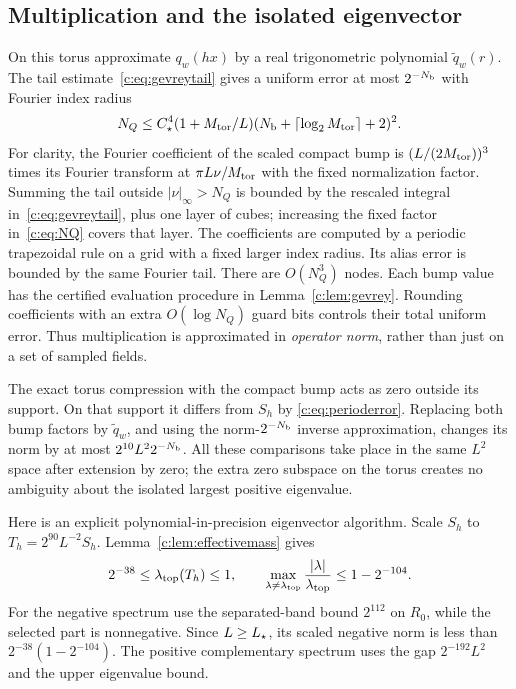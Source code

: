 \subsection{Multiplication and the isolated eigenvector}
On this torus approximate $q_w(hx)$ by a real trigonometric polynomial
$\widetilde q_w(r)$. The tail estimate~\eqref{c:eq:gevreytail} gives a uniform
error at most $2^{-N_{\rm b}}$ with Fourier index radius
\begin{equation}
 N_Q\le C_\star^4(1+M_{\rm tor}/L)(N_{\rm b}+\lceil\log_2M_{\rm tor}\rceil+2)^2.
                                                               \label{c:eq:NQ}
\end{equation}
For clarity, the Fourier coefficient of the scaled compact bump is
$(L/(2M_{\rm tor}))^3$ times its Fourier transform at $\pi L\nu/M_{\rm tor}$ with the
fixed normalization factor. Summing the tail outside $|\nu|_\infty>N_Q$
is bounded by the rescaled integral in~\eqref{c:eq:gevreytail}, plus
one layer of cubes; increasing the fixed factor in~\eqref{c:eq:NQ}
covers that layer. The coefficients are computed by a periodic
trapezoidal rule on a grid with a fixed larger index radius. Its
alias error is bounded by the same Fourier tail. There are
$O(N_Q^3)$ nodes. Each bump value has the certified evaluation
procedure in Lemma~\ref{c:lem:gevrey}. Rounding coefficients with an
extra $O(\log N_Q)$ guard bits controls their total uniform error.
Thus multiplication is approximated in \emph{operator norm}, rather
than just on a set of sampled fields.

The exact torus compression with the compact bump acts as zero
outside its support. On that support it differs from $S_h$ by
\eqref{c:eq:perioderror}. Replacing both bump factors by $\widetilde q_w$, and
using the norm-$2^{-N_{\rm b}}$ inverse approximation, changes its norm by
at most $2^{10}L^2 2^{-N_{\rm b}}$. All these comparisons take place in the
same $L^2$ space after extension by zero; the extra zero subspace
on the torus creates no ambiguity about the isolated largest
positive eigenvalue.

Here is an explicit polynomial-in-precision eigenvector algorithm.
Scale $S_h$ to $T_h=2^{90}L^{-2}S_h$. Lemma~\ref{c:lem:effectivemass}
gives
\begin{equation}
 2^{-38}\le\lambda_{\rm top}(T_h)\le1,
 \qquad
 \max_{\lambda\ne\lambda_{\rm top}}
       \frac{|\lambda|}{\lambda_{\rm top}}
       \le1-2^{-104}.                              \label{c:eq:powergap}
\end{equation}
For the negative spectrum use the separated-band bound
$2^{112}$ on $R_0$, while the selected part is nonnegative.
Since $L\ge L_\star$, its scaled negative norm is less than
$2^{-38}(1-2^{-104})$. The positive complementary spectrum uses
the gap $2^{-192}L^2$ and the upper eigenvalue bound.

